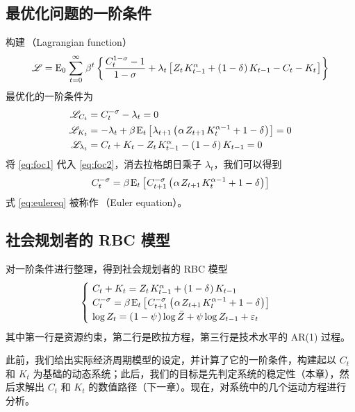 \subsection{最优化问题的一阶条件}\label{subsec:OptProbFOC}

构建\,（Lagrangian function）
\begin{align}
    \scr L=\mean_0\,\sum\wsito\,\beta^t\bkd{\dfrac{C_t^{1-\sigma}-1}{1-\sigma}+\lambda_t\bks{Z_t\,K\lt^\alpha+\bka{1-\delta}K_{t-1}-C_t-K_t}}
\end{align}
最优化的一阶条件为
\begin{align}
    \scr L_{C_t}&=C_t^{-\sigma}-\lambda_t=0 \label{eq:foc1}\\
    \scr L_{K_t}&=-\lambda_t+\beta\,\mean_t\bks{\lambda_{t+1}\bka{\alpha\, Z_{t+1}\,K_t^{\alpha-1}+1-\delta}}=0\label{eq:foc2}\\
    \scr L_{\lambda_t}&=C_t+K_t-Z_t\,K\lt^\alpha-\bka{1-\delta}K\lt=0\label{eq:foc3}
\end{align}
将 \ref{eq:foc1} 代入 \ref{eq:foc2}，消去拉格朗日乘子 \(\lambda_t\)，我们可以得到
\begin{align}
    C_t^{-\sigma}=\beta\,\mean_t\bks{C_{t+1}^{-\sigma}\bka{\alpha\, Z_{t+1}\,K_t^{\alpha-1}+1-\delta}}\label{eq:eulereq}
\end{align}
式 \ref{eq:eulereq} 被称作\,（Euler equation）。

\subsection{社会规划者的 RBC 模型}\label{subsec:RBCModel}

对一阶条件进行整理，得到社会规划者的 RBC 模型
\begin{equation}
    \begin{cases}
        \ C_t+K_t=Z_t\,K\lt^\alpha+\bka{1-\delta}K\lt \\
        \ C_t^{-\sigma}=\beta\,\mean_t\bks{C_{t+1}^{-\sigma}\bka{\alpha\, Z_{t+1}\,K_t^{\alpha-1}+1-\delta}}\\
        \ \log Z_t=\bka{1-\psi}\log\bar Z+\psi\log Z\lt+\varepsilon_t
    \end{cases}\label{eq:RBCModel}
\end{equation}
其中第一行是资源约束，第二行是欧拉方程，第三行是技术水平的 AR(1) 过程。

此前，我们给出实际经济周期模型的设定，并计算了它的一阶条件，构建起以 \(C_t\) 和 \(K_t\) 为基础的动态系统；此后，我们的目标是先判定系统的稳定性（本章），然后求解出 \(C_t\) 和 \(K_t\) 的数值路径（下一章）。现在，对系统中的几个运动方程进行分析。

